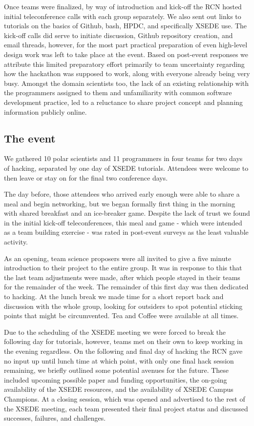 \documentclass[conference]{IEEEtran}
\begin{document}
Once teams were finalized, by way of introduction and kick-off the RCN hosted initial teleconference calls with each group separately.  We also sent out links to tutorials on the basics of Github, bash, HPDC, and specifically XSEDE use. The kick-off calls did serve to initiate discussion, Github repository creation, and email threads, however, for the most part practical preparation of even high-level design work was left to take place at the event.  Based on post-event responses we attribute this limited preparatory effort primarily to team uncertainty regarding how the hackathon was supposed to work, along with everyone already being very busy.  Amongst the domain scientists too, the lack of an existing relationship with the programmers assigned to them and unfamiliarity with common software development practice, led to a reluctance to share project concept and planning information publicly online.

\subsection{The event}
We gathered 10 polar scientists and 11 programmers in four teams for two days of hacking, separated by one day of XSEDE tutorials. Attendees were welcome to then leave or stay on for the final two conference days.  

The day before, those attendees who arrived early enough were able to share a meal and begin networking, but we began formally first thing in the morning with shared breakfast and an ice-breaker game. Despite the lack of trust we found in the initial kick-off teleconferences, this meal and game - which were intended as a team building exercise - was rated in post-event surveys as the least valuable activity.

As an opening, team science proposers were all invited to give a five minute introduction to their project to the entire group. It was in response to this that the last team adjustments were made, after which people stayed in their teams for the remainder of the week. The remainder of this first day was then dedicated to hacking.  At the lunch break we made time for a short report back and discussion with the whole group, looking for outsiders to spot potential sticking points that might be circumvented.  Tea and Coffee were available at all times.

Due to the scheduling of the XSEDE meeting we were forced to break the following day for tutorials, however, teams met on their own to keep working in the evening regardless. On the following and final day of hacking the RCN gave no input up until lunch time at which point, with only one final hack session remaining, we briefly outlined some potential avenues for the future. These included upcoming possible paper and funding opportunities, the on-going availability of the XSEDE resources, and the availability of XSEDE Campus Champions. At a closing session, which was opened and advertised to the rest of the XSEDE meeting, each team presented their final project status and discussed successes, failures, and challenges.
\end{document}
